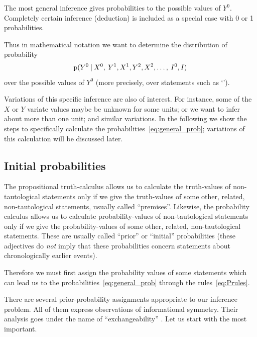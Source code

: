 \documentclass[a4paper,12pt,%
onecolumn,oneside,article,%
british%
]{memoir}
\newcommand*{\p}{\mathrm{p}}%
\renewcommand*{\|}[1][]{\nonscript\:#1\vert\nonscript\:\mathopen{}}
\newcommand*{\sects}{\S\S}%
\newcommand*{\ptext}[1]{\enquote*{\text{\small #1}}}%
\begin{document}
The most general inference gives probabilities to the possible values of $Y^{0}$. Completely certain inference (deduction) is included as a special case with 0 or 1 probabilities.

Thus in mathematical notation we want to determine the distribution of probability
\begin{equation}
  \label{eq:general_prob}
  \p(Y^{0} \| X^{0},\: Y^{1},X^{1},Y^{2},X^{2},\dotsc,\: I^{0},I)
\end{equation}
over the possible values of $Y^{0}$ (more precisely, over statements such as \ptext{Measurement of $Y$ for unit $0$ yields $y$}).

Variations of this specific inference are also of interest. For instance, some of the $X$ or $Y$ variate values maybe be unknown for some units; or we want to infer about more than one unit; and similar variations. In the following we show the steps to specifically calculate the probabilities~\eqref{eq:general_prob}; variations of this calculation will be discussed later.

\subsection{Initial probabilities}
\label{sec:initial_probs}

The propositional truth-calculus allows us to calculate the truth-values of non-tautological statements only if we give the truth-values of some other, related, non-tautological statements, usually called \enquote{premises}. Likewise, the probability calculus allows us to calculate probability-values of non-tautological statements only if we give the probability-values of some other, related, non-tautological statements. These are usually called \enquote{prior} or \enquote{initial} probabilities (these adjectives do \emph{not} imply that these probabilities concern statements about chronologically earlier events).

Therefore we must first assign the probability values of some statements which can lead us to the probabilities~\eqref{eq:general_prob} through the rules~\eqref{eq:Prules}.

There are several prior-probability assignments appropriate to our inference problem. All of them express observations of informational symmetry. Their analysis goes under the name of \enquote{exchangeability} \autocites[For a detailed account with references see][]{bernardoetal1994_r2000}[for a shorter summary,][]{dawid2013}[important references and variations are in][(Appendix on eduction)]{johnson1924}[\sects~4.2--4.3]{johnson1932}{definetti1930,definetti1937,hewittetal1955,ericson1969,heathetal1976,diaconis1977,diaconisetal1980,diaconisetal1980b,lindleyetal1981}[especially around \sects~7.3, 8.6]{lindley2006_r2014}. Let us start with the most important.
\end{document}
